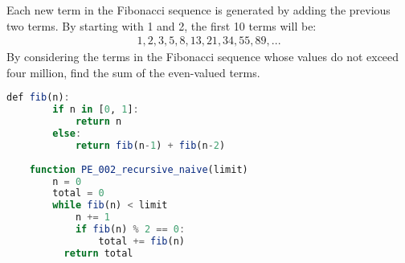 \begin{ProjectEuler}{1}
  Each new term in the Fibonacci sequence is generated by adding the previous
  two terms. By starting with 1 and 2, the first 10 terms will be:
  \begin{align*}
    1, 2, 3, 5, 8, 13, 21, 34, 55, 89, ...
  \end{align*}
  By considering the terms in the Fibonacci sequence whose values do not exceed
  four million, find the sum of the even-valued terms.
\end{ProjectEuler}

\begin{lstlisting}[language=Julia, caption=Naive recursive solution]
    def fib(n):
        if n in [0, 1]:
            return n
        else:
            return fib(n-1) + fib(n-2)
            
    function PE_002_recursive_naive(limit)
        n = 0 
        total = 0
        while fib(n) < limit
            n += 1
            if fib(n) % 2 == 0:
                total += fib(n)
	      return total
\end{lstlisting}

